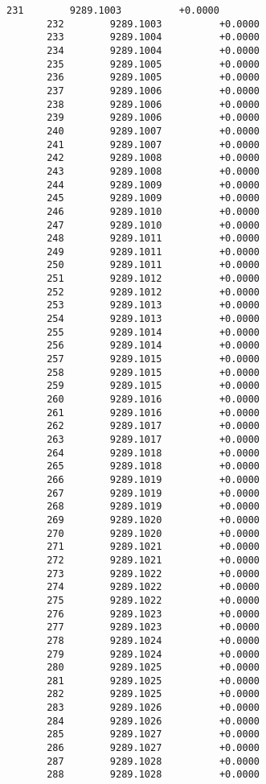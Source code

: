 \documentclass[11pt]{article}
\begin{document}
\begin{Verbatim}[commandchars=\\\{\}]
       231        9289.1003          +0.0000
       232        9289.1003          +0.0000
       233        9289.1004          +0.0000
       234        9289.1004          +0.0000
       235        9289.1005          +0.0000
       236        9289.1005          +0.0000
       237        9289.1006          +0.0000
       238        9289.1006          +0.0000
       239        9289.1006          +0.0000
       240        9289.1007          +0.0000
       241        9289.1007          +0.0000
       242        9289.1008          +0.0000
       243        9289.1008          +0.0000
       244        9289.1009          +0.0000
       245        9289.1009          +0.0000
       246        9289.1010          +0.0000
       247        9289.1010          +0.0000
       248        9289.1011          +0.0000
       249        9289.1011          +0.0000
       250        9289.1011          +0.0000
       251        9289.1012          +0.0000
       252        9289.1012          +0.0000
       253        9289.1013          +0.0000
       254        9289.1013          +0.0000
       255        9289.1014          +0.0000
       256        9289.1014          +0.0000
       257        9289.1015          +0.0000
       258        9289.1015          +0.0000
       259        9289.1015          +0.0000
       260        9289.1016          +0.0000
       261        9289.1016          +0.0000
       262        9289.1017          +0.0000
       263        9289.1017          +0.0000
       264        9289.1018          +0.0000
       265        9289.1018          +0.0000
       266        9289.1019          +0.0000
       267        9289.1019          +0.0000
       268        9289.1019          +0.0000
       269        9289.1020          +0.0000
       270        9289.1020          +0.0000
       271        9289.1021          +0.0000
       272        9289.1021          +0.0000
       273        9289.1022          +0.0000
       274        9289.1022          +0.0000
       275        9289.1022          +0.0000
       276        9289.1023          +0.0000
       277        9289.1023          +0.0000
       278        9289.1024          +0.0000
       279        9289.1024          +0.0000
       280        9289.1025          +0.0000
       281        9289.1025          +0.0000
       282        9289.1025          +0.0000
       283        9289.1026          +0.0000
       284        9289.1026          +0.0000
       285        9289.1027          +0.0000
       286        9289.1027          +0.0000
       287        9289.1028          +0.0000
       288        9289.1028          +0.0000

\end{Verbatim}
\end{document}
